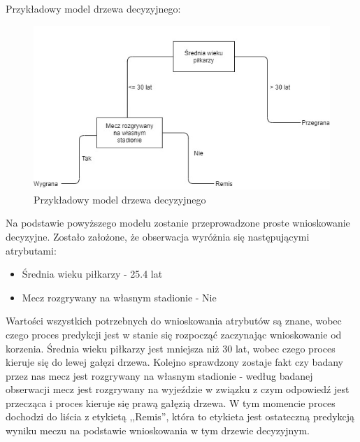 Przykładowy model drzewa decyzyjnego:
\begin{figure}[h] 
        \includegraphics[width=14cm]{figures/decTree.jpg}
        \caption{Przykładowy model drzewa decyzyjnego}
\end{figure}

Na podstawie powyższego modelu zostanie przeprowadzone proste wnioskowanie decyzyjne. Zostało założone, że obserwacja wyróżnia się następującymi atrybutami:
\begin{itemize}
    \item Średnia wieku piłkarzy - 25.4 lat
    \item Mecz rozgrywany na własnym stadionie - Nie
\end{itemize}
Wartości wszystkich potrzebnych do wnioskowania atrybutów są znane, wobec czego proces predykcji jest w stanie się rozpocząć zaczynając wnioskowanie od korzenia. Średnia wieku piłkarzy jest mniejsza niż 30 lat, wobec czego proces kieruje się do lewej gałęzi drzewa. Kolejno sprawdzony zostaje fakt czy badany przez nas mecz jest rozgrywany na własnym stadionie - według badanej obserwacji mecz jest rozgrywany na wyjeździe w związku z czym odpowiedź jest przecząca i proces kieruje się prawą gałęzią drzewa. W tym momencie proces dochodzi do liścia z etykietą ,,Remis'', która to etykieta jest ostateczną predykcją wyniku meczu na podstawie wnioskowania w tym drzewie decyzyjnym.\\

